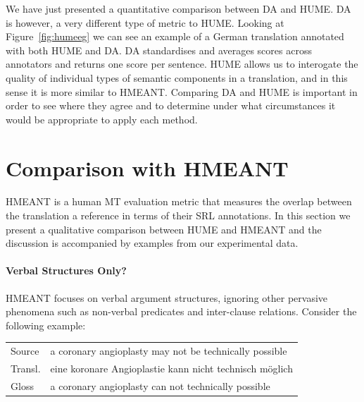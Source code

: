 \documentclass[11pt,letterpaper]{article}
\begin{document}
We have just presented a quantitative comparison between DA and HUME. DA is however, a very
different type of metric to HUME. Looking at Figure~\ref{fig:humeeg} we can see an example of
a German translation annotated with both HUME and DA. DA standardises and averages scores across annotators and returns one score per sentence. 
HUME allows us to interogate the quality of individual types of semantic components in a translation, and in
this sense it is more similar to HMEANT.
Comparing DA and HUME is important in order to see where they agree and to
determine under what circumstances it would be appropriate to apply each method. 

\section{Comparison with HMEANT}\label{sec:hmeant_comp}


HMEANT is a human MT evaluation metric that measures the overlap between the translation a reference
in terms of their SRL annotations.
In this section we present a qualitative comparison between HUME and HMEANT
and the discussion is accompanied by examples from our
experimental data.


\paragraph{Verbal Structures Only?}

HMEANT focuses on verbal argument structures, ignoring other pervasive phenomena such as non-verbal predicates and inter-clause relations. Consider the following example:

\begin{center}
\begin{tabular}{lp{5.4cm}}
Source & \small a coronary angioplasty may not be technically possible \\
Transl.& \small eine koronare Angioplastie kann nicht technisch m{\"o}glich \\
Gloss & \small a coronary angioplasty can not technically possible \\
\end{tabular}
\end{center}
\end{document}
